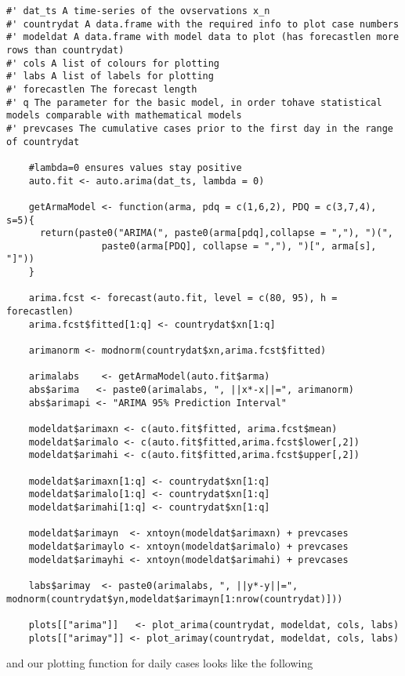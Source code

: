 \begin{lstlisting}[frame=single, caption = {Algorithm for ARIMA Model}]
#' dat_ts A time-series of the ovservations x_n
#' countrydat A data.frame with the required info to plot case numbers
#' modeldat A data.frame with model data to plot (has forecastlen more rows than countrydat)
#' cols A list of colours for plotting
#' labs A list of labels for plotting
#' forecastlen The forecast length 
#' q The parameter for the basic model, in order tohave statistical models comparable with mathematical models
#' prevcases The cumulative cases prior to the first day in the range of countrydat

    #lambda=0 ensures values stay positive
    auto.fit <- auto.arima(dat_ts, lambda = 0)
  
    getArmaModel <- function(arma, pdq = c(1,6,2), PDQ = c(3,7,4), s=5){
      return(paste0("ARIMA(", paste0(arma[pdq],collapse = ","), ")(",
                 paste0(arma[PDQ], collapse = ","), ")[", arma[s], "]"))
    }
  
    arima.fcst <- forecast(auto.fit, level = c(80, 95), h = forecastlen)
    arima.fcst$fitted[1:q] <- countrydat$xn[1:q]
  
    arimanorm <- modnorm(countrydat$xn,arima.fcst$fitted)
  
    arimalabs    <- getArmaModel(auto.fit$arma)
    abs$arima   <- paste0(arimalabs, ", ||x*-x||=", arimanorm)
    abs$arimapi <- "ARIMA 95% Prediction Interval"
    
    modeldat$arimaxn <- c(auto.fit$fitted, arima.fcst$mean)
    modeldat$arimalo <- c(auto.fit$fitted,arima.fcst$lower[,2])
    modeldat$arimahi <- c(auto.fit$fitted,arima.fcst$upper[,2])
  
    modeldat$arimaxn[1:q] <- countrydat$xn[1:q]
    modeldat$arimalo[1:q] <- countrydat$xn[1:q]
    modeldat$arimahi[1:q] <- countrydat$xn[1:q]
  
    modeldat$arimayn  <- xntoyn(modeldat$arimaxn) + prevcases
    modeldat$arimaylo <- xntoyn(modeldat$arimalo) + prevcases
    modeldat$arimayhi <- xntoyn(modeldat$arimahi) + prevcases

    labs$arimay  <- paste0(arimalabs, ", ||y*-y||=", modnorm(countrydat$yn,modeldat$arimayn[1:nrow(countrydat)]))
  
    plots[["arima"]]   <- plot_arima(countrydat, modeldat, cols, labs)
    plots[["arimay"]] <- plot_arimay(countrydat, modeldat, cols, labs)
\end{lstlisting}

and our plotting function for daily cases looks like the following

